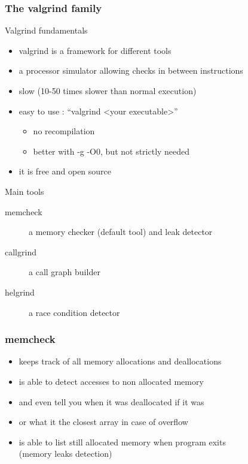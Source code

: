\begin{frame}[fragile]
  \frametitle{The valgrind family}
  \begin{block}{Valgrind fundamentals}
    \begin{itemize}
    \item valgrind is a framework for different tools
    \item a processor simulator allowing checks in between instructions
    \item slow (10-50 times slower than normal execution)
    \item easy to use : ``valgrind \textless{}your executable\textgreater''
      \begin{itemize}
      \item no recompilation
      \item better with -g -O0, but not strictly needed
      \end{itemize}
    \item it is free and open source
    \end{itemize}
  \end{block}
  \pause
  \begin{block}{Main tools}
    \begin{description}
      \item[memcheck] a memory checker (default tool) and leak detector
      \item[callgrind] a call graph builder
      \item[helgrind] a race condition detector
    \end{description}
  \end{block}
\end{frame}

\begin{frame}[fragile]
  \frametitle{memcheck}
  \begin{block}{}
    \begin{itemize}
      \item keeps track of all memory allocations and deallocations
      \item is able to detect accesses to non allocated memory
      \item and even tell you when it was deallocated if it was
      \item or what it the closest array in case of overflow
      \item is able to list still allocated memory when program exits\\
        (memory leaks detection)
    \end{itemize}
  \end{block}
\end{frame}

